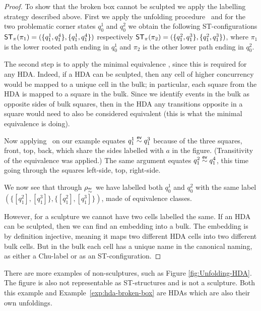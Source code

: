     \begin{proof}
    To show that the broken box cannot be sculpted we apply the labelling strategy described above.
    First we apply the unfolding procedure \hintost\ and for the two problematic corner states $q_{0}^{1}$ and $q_{0}^{2}$ we obtain the following ST-configurations $\mathsf{ST}_{\pi}(\pi_{1})=(\{q_{1}^{1},q_{1}^{4}\},\{q_{1}^{1},q_{1}^{4}\})$ respectively $\mathsf{ST}_{\pi}(\pi_{2})=(\{q_{1}^{2},q_{1}^{3}\},\{q_{1}^{2},q_{1}^{3}\})$, where $\pi_{1}$ is the lower rooted path ending in $q_{0}^{1}$ and $\pi_{2}$ is the other lower path ending in $q_{0}^{2}$.
    
    The second step is to apply the minimal equivalence \eventEquivHDAs, since this is required for any HDA. Indeed, if a HDA can be sculpted, then any cell of higher concurrency would be mapped to a unique cell in the bulk; in particular, each square from the HDA is mapped to a square in the bulk. Since we identify events in the bulk as opposite sides of bulk squares, then in the HDA any transitions opposite in a square would need to also be considered equivalent (this is what the minimal equivalence is doing).
    
    Now applying \eventEquivHDAs\ on our example equates $q_{1}^{1}\stackrel{\mathsf{ev}}{\sim} q_{1}^{3}$ because of the three squares, front, top, back, which share the sides labelled with $a$ in the figure. (Transitivity of the equivalence was applied.)
    The same argument equates $q_{1}^{2}\stackrel{\mathsf{ev}}{\sim} q_{1}^{4}$, this time going through the squares left-side, top, right-side.
    
    We now see that through $\rho_{\stackrel{\mathsf{ev}}{\sim}}$ we have labelled both $q_{0}^{1}$ and $q_{0}^{2}$ with the same label $(\{[q_{1}^{2}],[q_{1}^{3}]\},\{[q_{1}^{2}],[q_{1}^{3}]\})$, made of equivalence classes.
    
    However, for a sculpture we cannot have two cells labelled the same. If an HDA can be sculpted, then we can find an embedding into a bulk. The embedding is by definition injective, meaning it maps two different HDA cells into two different bulk cells. But in the bulk each cell has a unique name in the canonical naming, as either a Chu-label or as an ST-configuration.
    \end{proof}
    
    There are more examples of non-sculptures, such as Figure \ref{fig:Unfolding-HDA}. The figure is also not representable as ST-structures and is not a sculpture. Both this example and Example~\ref{exp:hda-broken-box} are HDAs which are also their own unfoldings.